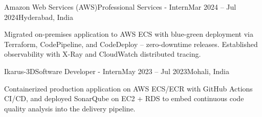 \resumeExp
{Amazon Web Services (AWS)}{Professional Services - Intern}{Mar 2024 -- Jul 2024}{Hyderabad, India}
\resumeItemListStart
    \item[$\diamond$] Migrated on-premises application to AWS ECS with blue-green deployment via Terraform, CodePipeline, and CodeDeploy -- zero-downtime releases. Established observability with X-Ray and CloudWatch distributed tracing.
\resumeItemListEnd

\resumeExp
{Ikarus-3D}{Software Developer - Intern}{May 2023 -- Jul 2023}{Mohali, India}
\resumeItemListStart
    \item[$\diamond$] Containerized production application on AWS ECS/ECR with GitHub Actions CI/CD, and deployed SonarQube on EC2 + RDS to embed continuous code quality analysis into the delivery pipeline.
\resumeItemListEnd

\resumeSubHeadingListEnd
